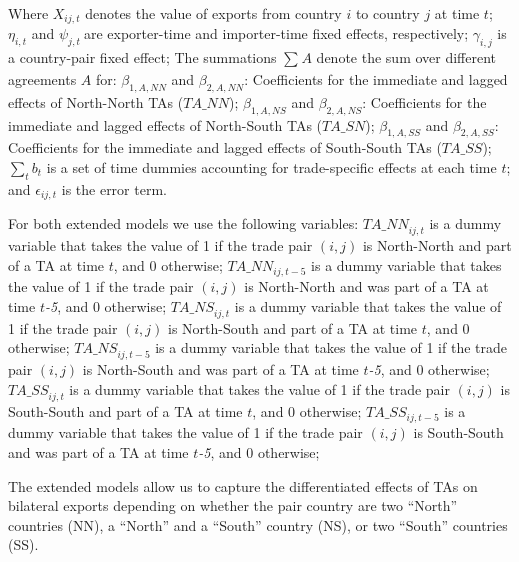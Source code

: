 Where \(X_{ij,t}\)\hspace{0pt} denotes the value of exports from country
\(i\) to country \(j\) at time \(t\); \(\eta_{i,t}\) and
\(\psi_{j,t}\ \)are exporter-time and importer-time fixed effects,
respectively; \(\gamma_{i,j}\) is a country-pair fixed effect;
The summations \hspace{0pt}\(\sum_{}^{}A\) denote the sum over different
agreements \(A\) for: \(\beta_{1,A,NN}\) and \(\beta_{2,A,NN}\):
Coefficients for the immediate and lagged effects of North-North TAs
\hspace{0pt}(\(TA\_ NN\)); \(\beta_{1,A,NS}\) and \(\beta_{2,A,NS}\):
Coefficients for the immediate and lagged effects of North-South TAs
(\(TA\_ SN\)); \(\beta_{1,A,SS}\) and \(\beta_{2,A,SS}\): Coefficients
for the immediate and lagged effects of South-South TAs (\(TA\_ SS\));
\(\sum_{t}^{}b_{t}\) is a set of time dummies accounting for
trade-specific effects at each time \(t\); and \(\epsilon_{ij,t}\) is
the error term.

For both extended models we use the following variables:
\({TA\_ NN}_{ij,t}\) is a dummy variable that takes the value of 1 if
the trade pair \((i,j)\) is North-North and part of a TA at time \(t\),
and 0 otherwise; \({TA\_ NN}_{ij,t - 5}\) is a dummy variable that takes
the value of 1 if the trade pair \((i,j)\) is North-North and was part
of a TA at time \(t\)\emph{-5}, and 0 otherwise; \({TA\_ NS}_{ij,t}\) is
a dummy variable that takes the value of 1 if the trade pair \((i,j)\)
is North-South and part of a TA at time \(t\), and 0 otherwise;
\({TA\_ NS}_{ij,t - 5}\) is a dummy variable that takes the value of 1
if the trade pair \((i,j)\) is North-South and was part of a TA at time
\(t\)\emph{-5}, and 0 otherwise; \({TA\_ SS}_{ij,t}\) is a dummy
variable that takes the value of 1 if the trade pair \((i,j)\) is
South-South and part of a TA at time \(t\), and 0 otherwise;
\({TA\_ SS}_{ij,t - 5}\) is a dummy variable that takes the value of 1
if the trade pair \((i,j)\) is South-South and was part of a TA at time
\(t\)\emph{-5}, and 0 otherwise;

The extended models allow us to capture the differentiated effects of
TAs on bilateral exports depending on whether the pair country are two
``North'' countries (NN), a ``North'' and a ``South'' country (NS), or
two ``South'' countries (SS).